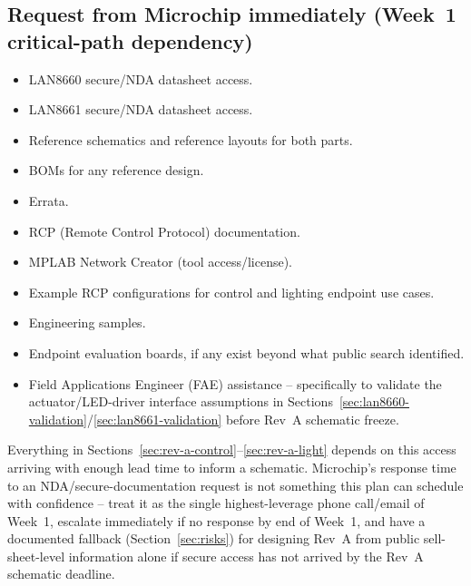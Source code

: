 \subsection{Request from Microchip immediately (Week~1 critical-path dependency)}

\begin{itemize}[itemsep=0.1em]
\item LAN8660 secure/NDA datasheet access.
\item LAN8661 secure/NDA datasheet access.
\item Reference schematics and reference layouts for both parts.
\item BOMs for any reference design.
\item Errata.
\item RCP (Remote Control Protocol) documentation.
\item MPLAB Network Creator (tool access/license).
\item Example RCP configurations for control and lighting endpoint use cases.
\item Engineering samples.
\item Endpoint evaluation boards, if any exist beyond what public search identified.
\item Field Applications Engineer (FAE) assistance -- specifically to validate the actuator/LED-driver interface assumptions in Sections~\ref{sec:lan8660-validation}/\ref{sec:lan8661-validation} before Rev~A schematic freeze.
\end{itemize}

\begin{risknote}[title={This is a real, unbounded-duration dependency}]
Everything in Sections~\ref{sec:rev-a-control}--\ref{sec:rev-a-light} depends on this access arriving with enough lead time to inform a schematic. Microchip's response time to an NDA/secure-documentation request is not something this plan can schedule with confidence -- treat it as the single highest-leverage phone call/email of Week~1, escalate immediately if no response by end of Week~1, and have a documented fallback (Section~\ref{sec:risks}) for designing Rev~A from public sell-sheet-level information alone if secure access has not arrived by the Rev~A schematic deadline.
\end{risknote}
